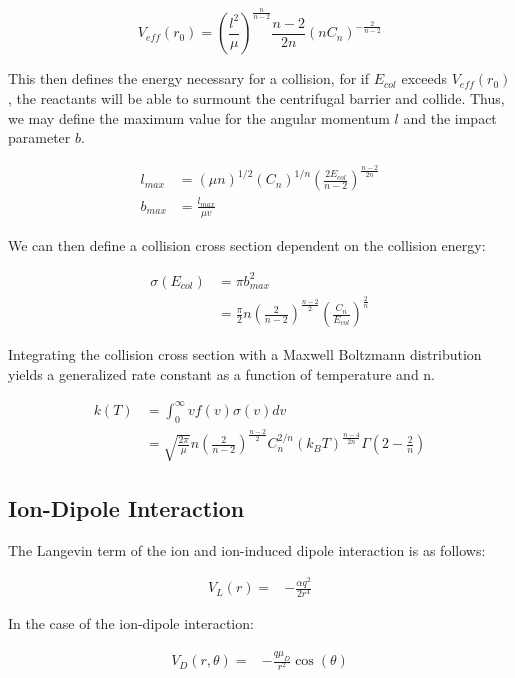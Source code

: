 \begin{equation}
    V_{eff}(r_0) = \left(\frac{l^2}{\mu}\right)^{\frac{n}{n-2}} \frac{n-2}{2n}(n C_n)^{-\frac{2}{n-2}}
\end{equation}

This then defines the energy necessary for a collision, for if $E_{col}$ exceeds $V_{eff}(r_0)$, the reactants will be able to surmount the centrifugal barrier and collide. Thus, we may define the maximum value for the angular momentum $l$ and the impact parameter $b$.

\begin{align*}
    l_{max} & = (\mu n)^{1/2}(C_n)^{1/n} \left(\frac{2 E_{col}}{n-2}\right)^{\frac{n-2}{2n}} \\
    b_{max} & = \frac{l_{max}}{\mu v}
\end{align*}

We can then define a collision cross section dependent on the collision energy:

\begin{align*}
    \sigma(E_{col}) & = \pi b^2_{max} \\
    & = \frac{\pi}{2} n \left(\frac{2}{n-2}\right)^{\frac{n-2}{2}} \left(\frac{C_n}{E_{col}}\right)^{\frac{2}{n}}
\end{align*}

Integrating the collision cross section with a Maxwell Boltzmann distribution yields a generalized rate constant as a function of temperature and n.

\begin{align}
    k(T) & = \int_0^{\infty} v f(v) \sigma(v) dv \label{eq: k int} \\
    & = \boxed{\sqrt{\frac{2 \pi}{\mu}}n\left(\frac{2}{n-2}\right)^{\frac{n-2}{2}}C_n^{2/n}(k_B T)^{\frac{n-4}{2n}}\Gamma\left(2-\frac{2}{n}\right)} \label{eq: k(T)}
\end{align}

\subsection{Ion-Dipole Interaction}

The Langevin term of the ion and ion-induced dipole interaction is as follows:

\begin{align}
V_L(r)= &-\frac{\alpha q^2}{2r^4}
\end{align}

In the case of the ion-dipole interaction:

\begin{align}
V_D(r, \theta) = & -\frac{q\mu_D}{r^2} \cos(\theta)
\end{align}

